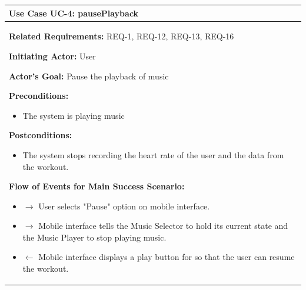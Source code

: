 \documentclass[letterpaper,english, 12pt]{scrreprt}
\begin{document}
\begin{center}
        \begin{tabular}{|C{15cm}|}
                \hline
                        \textbf{Use Case UC-4: pausePlayback}\\
                \hline
                        \begin{flushleft}
                                \textbf{Related Requirements: } REQ-1, REQ-12, REQ-13, REQ-16
                        \end{flushleft}
                        \begin{flushleft}
                                \textbf{Initiating Actor: } User
                        \end{flushleft}
                        \begin{flushleft}
                                \textbf{Actor's Goal: } Pause the playback of music
                        \end{flushleft}
                        \begin{flushleft}
                                \textbf{Preconditions: }
                        \end{flushleft}
                                \begin{itemize}
                                        \item The system is playing music
                                \end{itemize}
                        \begin{flushleft}
                                \textbf{Postconditions: }
                        \end{flushleft}
                                \begin{itemize}
                                        \item The system stops recording the heart rate of the user and the data from the workout.
                                \end{itemize}
                        \begin{flushleft}
                                \textbf{Flow of Events for Main Success Scenario: }
                        \end{flushleft}
                                \begin{itemize}
                                        \item $\rightarrow$ User selects "Pause" option on mobile interface.
					\item $\rightarrow$ Mobile interface tells the Music Selector to hold its current state and the Music Player to stop playing music.
                                        \item $\leftarrow$ Mobile interface displays a play button for so that the user can resume the workout.
                                \end{itemize}
                \\
				\hline
        \end{tabular}
\end{center}
\end{document}
